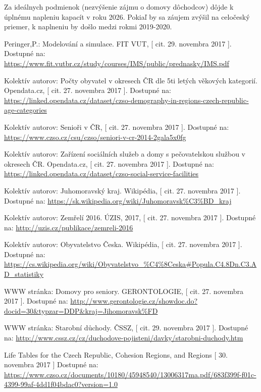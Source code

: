 \documentclass[a4paper, 11pt]{article}
\begin{document}
Za ideálnych podmienok (nezvýšenie zájmu o domovy dôchodcov) dôjde k úplnému napleniu kapacít v roku 2026. Pokiaľ by sa záujem zvýšil na celočeský priemer, k naplneniu by došlo medzi rokmi 2019-2020. 

\newpage
\renewcommand\refname{Zdroje}
\begin{thebibliography}{9}
 Peringer,P.: Modelování a simulace. FIT VUT, [ cit. 29. novembra 2017 ]. Dostupné na: \url{https://www.fit.vutbr.cz/study/courses/IMS/public/prednasky/IMS.pdf}

 Kolektív autorov: Počty obyvatel v okresech ČR dle 5ti letých věkových kategorií. Opendata.cz, [ cit. 27. novembra 2017 ]. Dostupné na: \url{https://linked.opendata.cz/dataset/czso-demography-in-regions-czech-republic-age-categories}

 Kolektív autorov: 	Senioři v ČR, [ cit. 27. novembra 2017 ]. Dostupné na: \url{https://www.czso.cz/csu/czso/seniori-v-cr-2014-2gala5x0fg}

 Kolektív autorov: Zařízení sociálních služeb a domy s pečovatelskou službou v okresech ČR. Opendata.cz, [ cit. 27. novembra 2017 ]. Dostupné na: \url{https://linked.opendata.cz/dataset/czso-social-service-facilities}

 Kolektív autorov: Juhomoravský kraj. Wikipédia, [ cit. 27. novembra 2017 ]. Dostupné na: \url{https://sk.wikipedia.org/wiki/Juhomoravsk%C3%BD_kraj}

 Kolektív autorov: Zemřelí 2016. ÚZIS, 2017, [ cit. 27. novembra 2017 ]. Dostupné na:
\url{http://uzis.cz/publikace/zemreli-2016}

 Kolektív autorov: Obyvatelstvo Česka. Wikipédia, [ cit. 27. novembra 2017 ]. Dostupné na: \url{https://cs.wikipedia.org/wiki/Obyvatelstvo_%C4%8Ceska#Popula.C4.8Dn.C3.AD_statistiky}

 WWW stránka: Domovy pro seniory. GERONTOLOGIE, [ cit. 27. novembra 2017 ]. Dostupné na: 
\url{http://www.gerontologie.cz/showdoc.do?docid=30&typzar=DDP&kraj=Jihomoravsk%FD}

 WWW stránka: Starobní důchody. ČSSZ, [ cit. 29. novembra 2017 ]. Dostupné na: 
\url{http://www.cssz.cz/cz/duchodove-pojisteni/davky/starobni-duchody.htm}

 Life Tables for the Czech Republic, Cohesion Regions, and Regions [ 30. novembra 2017 ] Dostupné na: \url{https://www.czso.cz/documents/10180/45948540/13006317ma.pdf/683f399f-f01c-4399-99af-4dd1f04bdac0?version=1.0}


\end{thebibliography}
\end{document}
